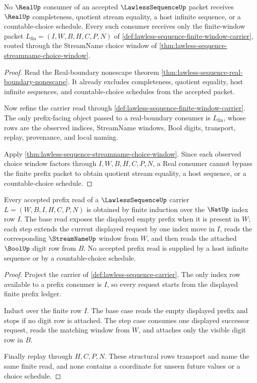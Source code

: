\begin{theorem}
\label{thm:lawless-sequence-real-nonescape}
No $\RealUp$ consumer of an accepted $\LawlessSequenceUp$ packet receives $\RealUp$ completeness, quotient stream equality, a host infinite sequence, or a countable-choice schedule. Every such consumer receives only the finite-window packet $L_{\mathrm{fin}}=(I,W,B,H,C,P,N)$ of \autoref{def:lawless-sequence-finite-window-carrier}, routed through the StreamName choice window of \autoref{thm:lawless-sequence-streamname-choice-window}.
\end{theorem}
\begin{proof}
Read the Real-boundary nonescape theorem \autoref{thm:lawless-sequence-real-boundary-nonescape}. It already excludes completeness, quotient equality, host infinite sequences, and countable-choice schedules from the accepted packet.

Now refine the carrier read through \autoref{def:lawless-sequence-finite-window-carrier}. The only prefix-facing object passed to a real-boundary consumer is $L_{\mathrm{fin}}$, whose rows are the observed indices, StreamName windows, Bool digits, transport, replay, provenance, and local naming.

Apply \autoref{thm:lawless-sequence-streamname-choice-window}. Since each observed choice window factors through $I,W,B,H,C,P,N$, a Real consumer cannot bypass the finite prefix packet to obtain quotient stream equality, a host sequence, or a countable-choice schedule.
\end{proof}

\begin{theorem}
\label{thm:lawless-sequence-prefix-induction-obligation}
Every accepted prefix read of a $\LawlessSequenceUp$ carrier $L=(W,B,I,H,C,P,N)$ is obtained by finite induction over the $\NatUp$ index row $I$. The base read exposes the displayed empty prefix when it is present in $W$; each step extends the current displayed request by one index move in $I$, reads the corresponding $\StreamNameUp$ window from $W$, and then reads the attached $\BoolUp$ digit row from $B$. No accepted prefix read is supplied by a host infinite sequence or by a countable-choice schedule.
\end{theorem}
\begin{proof}
Project the carrier of \autoref{def:lawless-sequence-carrier}. The only index row available to a prefix consumer is $I$, so every request starts from the displayed finite prefix ledger.

Induct over the finite row $I$. The base case reads the empty displayed prefix and stops if no digit row is attached. The step case consumes one displayed successor request, reads the matching window from $W$, and attaches only the visible digit row in $B$.

Finally replay through $H,C,P,N$. These structural rows transport and name the same finite read, and none contains a coordinate for unseen future values or a choice schedule.
\end{proof}

